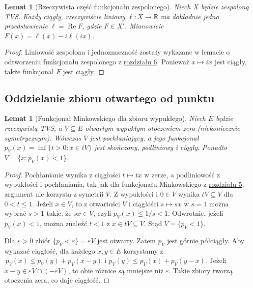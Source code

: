 \documentclass[11pt,a4paper]{article}
\numberwithin{equation}{section}
\theoremstyle{plain}
\newtheorem{lemat}[twierdzenie]{Lemat}
\theoremstyle{definition}
\theoremstyle{remark}
\newcommand{\R}{\mathbb R}
\begin{document}
\begin{lemat}[Rzeczywista część funkcjonału zespolonego]\label{lem:realification}
Niech $X$ będzie zespoloną TVS. Każdy ciągły, rzeczywiście liniowy
$\ell:X\to\R$ ma dokładnie jedno przedstawienie
$\ell=\operatorname{Re}F$, gdzie $F\in X'$. Mianowicie
$F(x)=\ell(x)-i\ell(ix)$.
\end{lemat}
\begin{proof}
Liniowość zespolona i jednoznaczność zostały wykazane w
lemacie o odtworzeniu funkcjonału zespolonego z \hyperref[sec:hahn-banach]{rozdziału 6}. Ponieważ $x\mapsto ix$
jest ciągły, także funkcjonał $F$ jest ciągły.
\end{proof}

\subsection{Oddzielanie zbioru otwartego od punktu}

\begin{lemat}[Funkcjonał Minkowskiego dla zbioru wypukłego]\label{lem:open-gauge}
Niech $E$ będzie rzeczywistą TVS, a $V\subseteq E$ otwartym
wypukłym otoczeniem zera (niekoniecznie symetrycznym).
Wówczas $V$ jest pochłaniający, a jego funkcjonał
$p_V(x)=\inf\{t>0:x\in tV\}$ jest skończony, podliniowy i ciągły.
Ponadto $V=\{x:p_V(x)<1\}$.
\end{lemat}
\begin{proof}
Pochłanianie wynika z ciągłości $t\mapsto tx$ w zerze,
a podliniowość z wypukłości i pochłaniania, tak jak dla
funkcjonału Minkowskiego z \hyperref[sec:lokalnie-wypukle]{rozdziału 5}; argument nie korzysta
z symetrii $V$. Z wypukłości i $0\in V$ wynika
$tV\subseteq V$ dla $0<t\le1$. Jeżeli $x\in V$, to
z otwartości $V$ i ciągłości $s\mapsto sx$ w $s=1$
można wybrać $s>1$ takie, że $sx\in V$, czyli
$p_V(x)\le1/s<1$. Odwrotnie, jeżeli $p_V(x)<1$,
można znaleźć $t<1$ z $x\in tV\subseteq V$.
Stąd $V=\{p_V<1\}$.

Dla $\varepsilon>0$ zbiór $\{p_V<\varepsilon\}=\varepsilon V$
jest otwarty. Zatem $p_V$ jest górnie półciągły. Aby
wykazać ciągłość, dla każdego $x,y\in E$ korzystamy z
$\,p_V(x)\le p_V(y)+p_V(x-y)$ i
$p_V(y)\le p_V(x)+p_V(y-x)$.
Jeżeli $x-y\in\varepsilon V\cap(-\varepsilon V)$,
to obie różnice są mniejsze niż $\varepsilon$.
Takie zbiory tworzą otoczenia zera, co daje ciągłość.
\end{proof}
\end{document}
